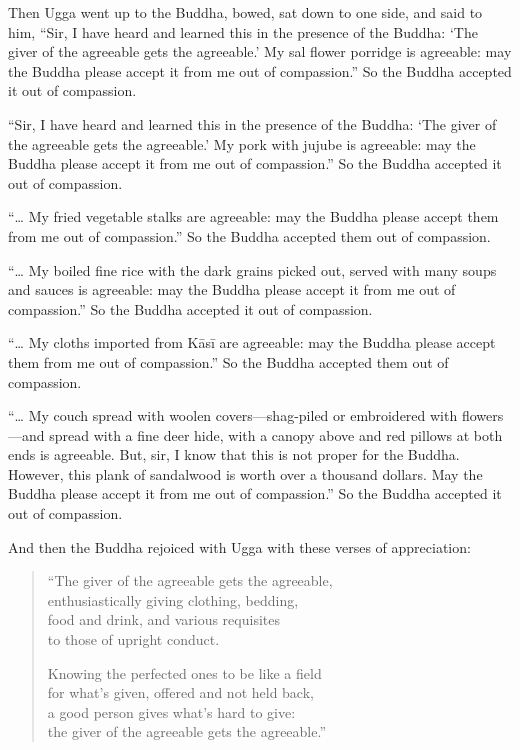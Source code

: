 \documentclass[12pt,openany]{book}%
\begin{document}
Then Ugga went up to the Buddha, bowed, sat down to one side, and said to him, “Sir, I have heard and learned this in the presence of the Buddha: ‘The giver of the agreeable gets the agreeable.’ My sal flower porridge is agreeable: may the Buddha please accept it from me out of compassion.” So the Buddha accepted it out of compassion. 

“Sir, I have heard and learned this in the presence of the Buddha: ‘The giver of the agreeable gets the agreeable.’ My pork with jujube is agreeable: may the Buddha please accept it from me out of compassion.” So the Buddha accepted it out of compassion. 

“… My fried vegetable stalks are agreeable: may the Buddha please accept them from me out of compassion.” So the Buddha accepted them out of compassion. 

“… My boiled fine rice with the dark grains picked out, served with many soups and sauces is agreeable: may the Buddha please accept it from me out of compassion.” So the Buddha accepted it out of compassion. 

“… My cloths imported from \textsanskrit{Kāsī} are agreeable: may the Buddha please accept them from me out of compassion.” So the Buddha accepted them out of compassion. 

“… My couch spread with woolen covers—shag-piled or embroidered with flowers—and spread with a fine deer hide, with a canopy above and red pillows at both ends is agreeable. But, sir, I know that this is not proper for the Buddha. However, this plank of sandalwood is worth over a thousand dollars. May the Buddha please accept it from me out of compassion.” So the Buddha accepted it out of compassion. 

And then the Buddha rejoiced with Ugga with these verses of appreciation: 

\begin{verse}%
“The giver of the agreeable gets the agreeable, \\
enthusiastically giving clothing, bedding, \\
food and drink, and various requisites \\
to those of upright conduct. 

Knowing the perfected ones to be like a field \\
for what’s given, offered and not held back, \\
a good person gives what’s hard to give: \\
the giver of the agreeable gets the agreeable.” 

%
\end{verse}
\end{document}
